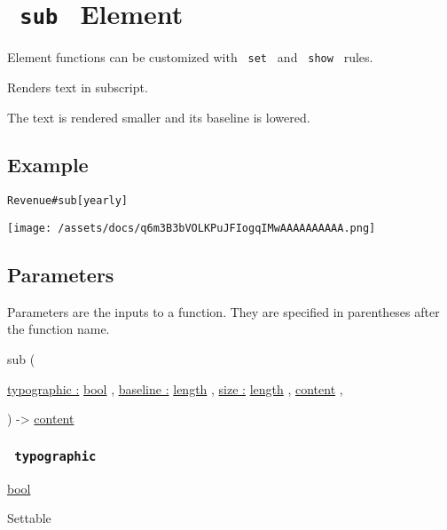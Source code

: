 \section{\texorpdfstring{\texttt{\ sub\ } {{ Element
}}}{ sub   Element }}\label{summary}

\label{element-tooltip}
Element functions can be customized with \texttt{\ set\ } and
\texttt{\ show\ } rules.

Renders text in subscript.

The text is rendered smaller and its baseline is lowered.

\subsection{Example}\label{example}

\begin{verbatim}
Revenue#sub[yearly]
\end{verbatim}

\texttt{[image: /assets/docs/q6m3B3bVOLKPuJFIogqIMwAAAAAAAAAA.png]}

\subsection{\texorpdfstring{{ Parameters
}}{ Parameters }}\label{parameters}

\label{parameters-tooltip}
Parameters are the inputs to a function. They are specified in
parentheses after the function name.

{ sub } (

{ \hyperref[parameters-typographic]{typographic :}
\href{/docs/reference/foundations/bool/}{bool} , } {
\hyperref[parameters-baseline]{baseline :}
\href{/docs/reference/layout/length/}{length} , } {
\hyperref[parameters-size]{size :}
\href{/docs/reference/layout/length/}{length} , } {
\href{/docs/reference/foundations/content/}{content} , }

) -\textgreater{} \href{/docs/reference/foundations/content/}{content}

\subsubsection{\texorpdfstring{\texttt{\ typographic\ }}{ typographic }}\label{parameters-typographic}

\href{/docs/reference/foundations/bool/}{bool}

{{ Settable }}

